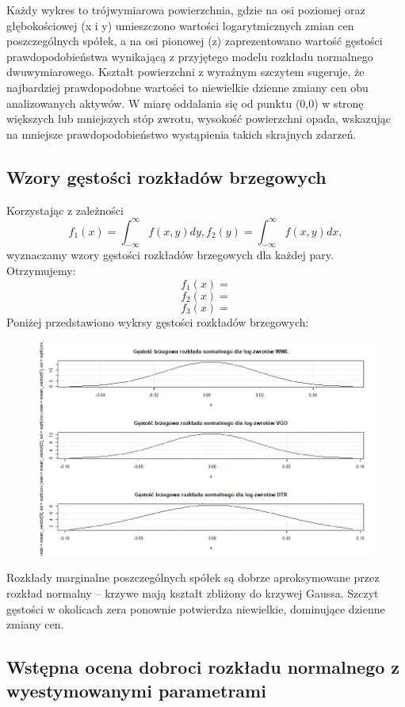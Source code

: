\documentclass[a4paper,11pt]{article}
\begin{document}
Każdy wykres to trójwymiarowa powierzchnia, gdzie na osi poziomej oraz głębokościowej (x i y) umieszczono wartości logarytmicznych zmian cen poszczególnych spółek, a na osi pionowej (z) zaprezentowano wartość gęstości prawdopodobieństwa wynikającą z przyjętego modelu rozkładu normalnego dwuwymiarowego. Kształt powierzchni z wyraźnym szczytem sugeruje, że najbardziej prawdopodobne wartości to niewielkie dzienne zmiany cen obu analizowanych aktywów. W miarę oddalania się od punktu (0,0) w stronę większych lub mniejszych stóp zwrotu, wysokość powierzchni opada, wskazując na mniejsze prawdopodobieństwo wystąpienia takich skrajnych zdarzeń. 

\subsection{Wzory gęstości rozkładów brzegowych}
Korzystając z zależności
$$f_1(x)=\int_{-\infty}^{\infty}f(x,y)dy, f_2(y)=\int_{-\infty}^{\infty}f(x,y)dx,$$
wyznaczamy wzory gęstości rozkładów brzegowych dla każdej pary.\\ Otrzymujemy:
$$f_1(x)=$$
$$f_2(x)=$$
$$f_3(x)=$$
Poniżej przedstawiono wykrsy gęstości rozkładów brzegowych:
\begin{figure}[H]
    \centering
    \includegraphics[width=1\textwidth]{./img/gestosci-brzegowe.png}
\end{figure}
Rozkłady marginalne poszczególnych spółek są dobrze aproksymowane przez rozkład normalny – krzywe mają kształt zbliżony do krzywej Gaussa. Szczyt gęstości w okolicach zera ponownie potwierdza niewielkie, dominujące dzienne zmiany cen.

\subsection{Wstępna ocena dobroci rozkładu normalnego z wyestymowanymi parametrami}
\end{document}
